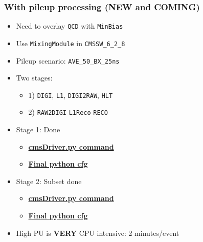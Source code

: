 \documentclass[bigger]{beamer}
\providecommand{\alert}[1]{\textbf{#1}}
\begin{document}
\begin{frame}
\frametitle{With pileup processing (NEW and COMING)}
\label{sec-2-2-2}
\begin{itemize}

\item Need to overlay \texttt{QCD} with \texttt{MinBias}
\label{sec-2-2-2-1}%

\item Use \texttt{MixingModule} in \texttt{CMSSW\_6\_2\_8}
\label{sec-2-2-2-2}%

\item Pileup scenario: \texttt{AVE\_50\_BX\_25ns}
\label{sec-2-2-2-3}%

\item Two stages:
\label{sec-2-2-2-4}%
\begin{itemize}

\item 1) \texttt{DIGI}, \texttt{L1}, \texttt{DIGI2RAW}, \texttt{HLT}
\label{sec-2-2-2-4-1}%

\item 2) \texttt{RAW2DIGI} \texttt{L1Reco} \texttt{RECO}
\label{sec-2-2-2-4-2}%
\end{itemize} %

\item Stage 1: Done
\label{sec-2-2-2-5}%
\begin{itemize}

\item \href{https://github.com/edmundaberry/HcalReco/blob/master/test/hcalNoise_fromGEN-SIM_toGEN-SIM-RAW_62X_withMixer_cmsDriver.sh}{\alert{cmsDriver.py command}}
\label{sec-2-2-2-5-1}%

\item \href{https://github.com/edmundaberry/HcalReco/blob/master/test/hcalNoise_fromGEN-SIM_toGEN-SIM-RAW_62X_withMixer_cfg.py}{\alert{Final python cfg}}
\label{sec-2-2-2-5-2}%
\end{itemize} %

\item Stage 2: Subset done
\label{sec-2-2-2-6}%
\begin{itemize}

\item \href{https://github.com/edmundaberry/HcalReco/blob/master/test/hcalNoise_fromGEN-SIM-RAW_62X_cmsDriver.sh}{\alert{cmsDriver.py command}}
\label{sec-2-2-2-6-1}%

\item \href{https://github.com/edmundaberry/HcalReco/blob/master/test/hcalNoise_fromGEN-SIM-RAW_62X_cfg.py}{\alert{Final python cfg}}
\label{sec-2-2-2-6-2}%
\end{itemize} %

\item High PU is \alert{VERY} CPU intensive: 2 minutes/event
\label{sec-2-2-2-7}%
\end{itemize} %
\end{frame}
\end{document}
